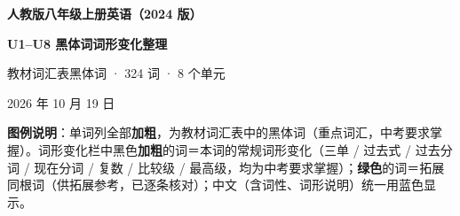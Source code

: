 \documentclass[UTF8,a4paper,11pt]{ctexart}
\begin{document}
\begin{center}
{\sffamily\bfseries\fontsize{20pt}{26pt}\selectfont\color{headblue} 人教版八年级上册英语（2024 版）\par}
\vspace{2pt}
{\sffamily\bfseries\fontsize{17pt}{22pt}\selectfont\color{headblue} U1--U8 黑体词词形变化整理\par}
\vspace{7pt}
{\small\color{textgray} 教材词汇表黑体词 · 324 词 · 8 个单元\par}
\vspace{2pt}
{\scriptsize\color{textgray} 2026 年 10 月 19 日\par}
\end{center}
\vspace{2pt}

{\small\color{textgray}\textbf{图例说明}：单词列全部\textbf{加粗}，为教材词汇表中的黑体词（重点词汇，中考要求掌握）。词形变化栏中黑色\textbf{加粗}的词＝本词的常规词形变化（三单 / 过去式 / 过去分词 / 现在分词 / 复数 / 比较级 / 最高级，均为中考要求掌握）；\textbf{\color{cngreen}绿色}的词＝拓展同根词（供拓展参考，已逐条核对）；中文（含词性、词形说明）统一用蓝色显示。}

\vspace{4pt}
\end{document}
